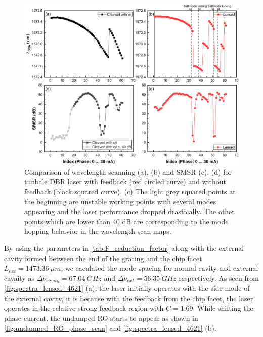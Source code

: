 \begin{figure}[ht]
    \centering
    \includegraphics[width=\linewidth]{figures/OSA_and_SMSR.png}
    \caption{Comparison of wavelength scanning (a), (b) and SMSR (c), (d) for tunbale DBR laser with feedback (red circled curve) and without feedback (black squared curve). (c) The light grey squared points at the beginning are unstable working points with several modes appearing and the laser performance dropped drastically. The other points which are lower than 40 dB are corresponding to the mode hopping behavior in the wavelength scan maps.}
    \label{fig:OSA_and_SMSR}
\end{figure}

By using the parameters in \autoref{tab:F_reduction_factor} along with the external cavity formed between the end of the grating and the chip facet $L_{ext}=1473.36 \ \mu m$, we caculated the mode spacing for normal cavity and external cavaity as $\Delta\nu_{cavity}=67.04 \ GHz$ and $\Delta\nu_{ext}=56.35 \ GHz$ respectively. As seen from \autoref{fig:spectra_lensed_4621} (a), the laser initially operates with the side mode of the external cavity, it is because with the feedback from the chip facet, the laser operates in the relative strong feedback region with $C=1.69$. While shifting the phase current, the undamped RO starts to appear as shown in \autoref{fig:undamped_RO_phase_scan} and \autoref{fig:spectra_lensed_4621} (b).

